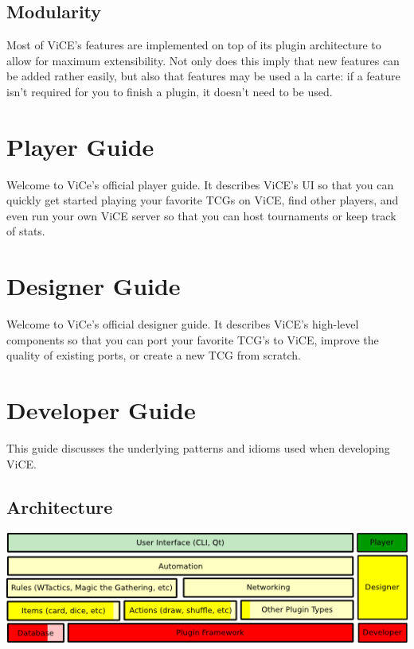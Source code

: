 \documentclass[letterpaper,10pt,english]{sphinxmanual}
\begin{document}
\section{Modularity}
\label{preface:modularity}
Most of ViCE's features are implemented on top
of its plugin architecture to allow for maximum extensibility. Not only does
this imply that new features can be added rather easily, but also that features
may be used a la carte: if a feature isn't required for you to finish a plugin,
it doesn't need to be used.


\chapter{Player Guide}
\label{player_guide/player_index:player-guide}\label{player_guide/player_index::doc}
Welcome to ViCe's official player guide. It describes ViCE's UI so that you
can quickly get started playing your favorite TCGs on ViCE, find other
players, and even run your own ViCE server so that you can host tournaments
or keep track of stats.


\chapter{Designer Guide}
\label{designer_guide/designer_index:designer-guide}\label{designer_guide/designer_index::doc}
Welcome to ViCe's official designer guide. It describes ViCE's high-level
components so that you can port your favorite TCG's to ViCE, improve
the quality of existing ports, or create a new TCG from scratch.


\chapter{Developer Guide}
\label{developer_guide/developer_index::doc}\label{developer_guide/developer_index:developer-guide}
This guide discusses the underlying patterns and idioms used when developing
ViCE.


\section{Architecture}
\label{developer_guide/architecture::doc}\label{developer_guide/architecture:architecture}
\includegraphics{stack_diagram.png}
\end{document}
